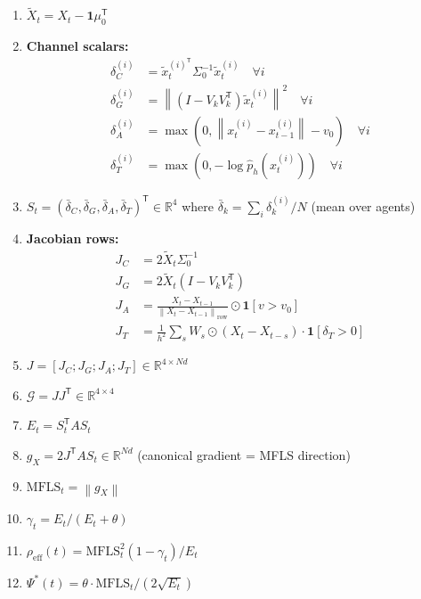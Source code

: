 \documentclass[11pt,a4paper]{article}
\theoremstyle{definition}
\newcommand{\R}{\mathbb{R}}
\newcommand{\T}{^{\mathsf{T}}}
\newcommand{\norm}[1]{\left\|#1\right\|}
\newcommand{\gX}{g_X}
\newcommand{\mfls}{\mathrm{MFLS}}
\begin{document}
\begin{enumerate}
\item $\tilde X_t = X_t - \mathbf{1}\mu_0\T$

\item \textbf{Channel scalars:}
\begin{align*}
\delta_C^{(i)} &= \tilde x_t^{(i)\T}\Sigma_0^{-1}\tilde x_t^{(i)} \quad\forall i \\
\delta_G^{(i)} &= \norm{(I-V_kV_k\T)\tilde x_t^{(i)}}^2 \quad\forall i \\
\delta_A^{(i)} &= \max(0, \norm{x_t^{(i)}-x_{t-1}^{(i)}}-v_0) \quad\forall i \\
\delta_T^{(i)} &= \max(0, -\log\hat{p}_h(x_t^{(i)})) \quad\forall i
\end{align*}

\item $S_t = (\bar\delta_C, \bar\delta_G, \bar\delta_A, \bar\delta_T)\T \in \R^4$
where $\bar\delta_k = \sum_i\delta_k^{(i)}/N$ (mean over agents)

\item \textbf{Jacobian rows:}
\begin{align*}
J_C &= 2\tilde X_t\Sigma_0^{-1} \\
J_G &= 2\tilde X_t(I-V_kV_k\T) \\
J_A &= \frac{X_t-X_{t-1}}{\norm{X_t-X_{t-1}}_\mathrm{row}}\odot\mathbf{1}[v>v_0] \\
J_T &= \frac{1}{h^2}\sum_s W_s\odot(X_t-X_{t-s})\cdot\mathbf{1}[\delta_T>0]
\end{align*}

\item $J = [J_C; J_G; J_A; J_T] \in \R^{4\times Nd}$

\item $\mathcal{G} = JJ\T \in \R^{4\times 4}$

\item $E_t = S_t\T AS_t$

\item $\gX = 2J\T AS_t \in \R^{Nd}$ \hfill (canonical gradient = MFLS direction)

\item $\mfls_t = \norm{\gX}$

\item $\gamma_t = E_t/(E_t+\theta)$

\item $\rho_\mathrm{eff}(t) = \mfls_t^2(1-\gamma_t)/E_t$

\item $\Psi^*(t) = \theta\cdot\mfls_t/(2\sqrt{E_t})$


\end{enumerate}
\end{document}
